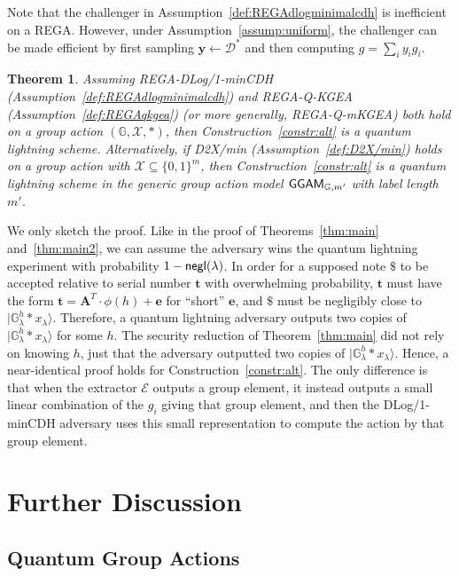 \documentclass{article}\usepackage[a4paper,margin=20mm]{geometry}
\newtheorem{theorem}{Theorem}\newtheorem{lemma}[theorem]{Lemma}\newtheorem{proposition}[theorem]{Proposition}\newtheorem{corollary}[theorem]{Corollary}\newtheorem{definition}[theorem]{Definition}\newtheorem{claim}[theorem]{Claim}\newtheorem{remark}[theorem]{Remark}\newtheorem{observation}[theorem]{Observation}\newtheorem{conjecture}[theorem]{Conjecture}\newtheorem{example}[theorem]{Example}
\numberwithin{theorem}{section}
\numberwithin{equation}{section}
\newcommand{\G}{\mathbb{G}}
\newcommand{\ev}{{\mathbf{e}}}
\newcommand{\tv}{{\mathbf{t}}}
\newcommand{\yv}{{\mathbf{y}}}
\newcommand{\Am}{{\mathbf{A}}}
\newcommand{\Ds}{{\mathcal{D}}}
\newcommand{\Es}{{\mathcal{E}}}
\newcommand{\Xs}{{\mathcal{X}}}
\newcommand{\negl}{{\sf negl}}
\newcommand{\GGAM}{{\sf GGAM}}
\begin{document}
Note that the challenger in Assumption~\ref{def:REGAdlogminimalcdh} is inefficient on a REGA. However, under Assumption~\ref{assump:uniform}, the challenger can be made efficient by first sampling $\yv\gets\Ds^*$ and then computing $g=\sum_i y_i g_i$.



\begin{theorem}\label{thm:alt} Assuming REGA-DLog/1-minCDH (Assumption~\ref{def:REGAdlogminimalcdh}) and REGA-Q-KGEA (Assumption~\ref{def:REGAqkgea}) (or more generally, REGA-Q-mKGEA) both hold on a group action $(\G,\Xs,*)$, then Construction~\ref{constr:alt} is a quantum lightning scheme. Alternatively, if D2X/min (Assumption~\ref{def:D2X/min}) holds on a group action with $\Xs\subseteq\{0,1\}^m$, then Construction~\ref{constr:alt} is a quantum lightning scheme in the generic group action model $\GGAM_{\G,m'}$ with label length $m'$.
\end{theorem}

We only sketch the proof. Like in the proof of Theorems~\ref{thm:main} and~\ref{thm:main2}, we can assume the adversary wins the quantum lightning experiment with probability $1-\negl(\lambda)$. In order for a supposed note $\$$ to be accepted relative to serial number $\tv$ with overwhelming probability, $\tv$ must have the form $\tv=\Am^T\cdot\phi(h)+\ev$ for ``short'' $\ev$, and $\$$ must be negligibly close to $|\G_\lambda^h*x_\lambda\rangle$. Therefore, a quantum lightning adversary outputs two copies of $|\G_\lambda^h*x_\lambda\rangle$ for some $h$. The security reduction of Theorem~\ref{thm:main} did not rely on knowing $h$, just that the adversary outputted two copies of $|\G_\lambda^h*x_\lambda\rangle$. Hence, a near-identical proof holds for Construction~\ref{constr:alt}. The only difference is that when the extractor $\Es$ outputs a group element, it instead outputs a small linear combination of the $g_i$ giving that group element, and then the DLog/1-minCDH adversary uses this small representation to compute the action by that group element.








\section{Further Discussion}\label{sec:discuss}

\subsection{Quantum Group Actions}
\end{document}
